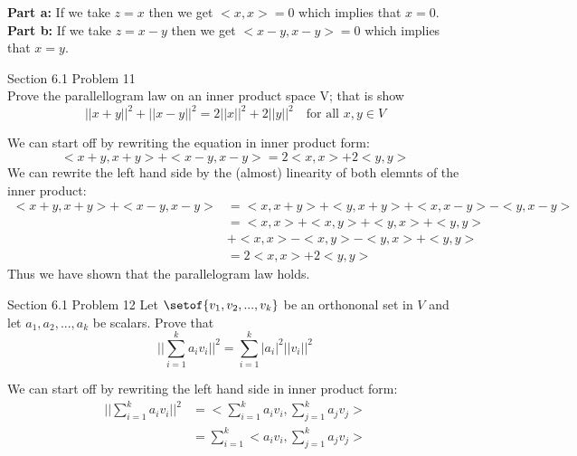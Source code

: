\documentclass[answers,12pt,addpoints]{exam}
\begin{document}
\begin{questions}
    \begin{solution}
        \textbf{Part a:} If we take $z = x$ then we get $<x,x> = 0$ which implies that $x = 0$.\\
        \textbf{Part b:} If we take $z = x - y$ then we get $<x-y,x-y> = 0$ which implies that $x = y$.
    \end{solution}
    \question Section 6.1 Problem 11\\
    Prove the parallellogram law on an inner product space V; that is show
    $$||x+y||^2 + ||x-y||^2 = 2||x||^2 + 2||y||^2 \quad \text{for all } x,y \in V$$
    \begin{solution}
        We can start off by rewriting the equation in inner product form:
        $$ <x+y,x+y> + <x-y,x-y> = 2<x,x> + 2<y,y>$$
        We can rewrite the left hand side by the (almost) linearity of both elemnts of the inner product:
        \begin{align*}
            <x+y,x+y> + <x-y,x-y> &= <x,x+y> + <y,x+y> + <x,x-y> - <y,x-y>\\
            &= <x,x> + <x,y> + <y,x> + <y,y> \\
            &+ <x,x> - <x,y> - <y,x> + <y,y>\\
            &= 2<x,x> + 2<y,y>
        \end{align*}
        Thus we have shown that the parallelogram law holds.
    \end{solution}
    \question Section 6.1 Problem 12
    Let $\setof{v_1,v_2,...,v_k}$ be an orthononal set in $V$ and let $a_1,a_2,...,a_k$ be scalars. Prove that
    $$ ||\sum_{i=1}^{k} a_iv_i||^2 = \sum_{i=1}^{k} |a_i|^2||v_i||^2$$
    \begin{solution}
        We can start off by rewriting the left hand side in inner product form:
        \begin{align*}
            ||\sum_{i=1}^{k} a_iv_i||^2 &= <\sum_{i=1}^{k} a_iv_i, \sum_{j=1}^{k} a_jv_j>\\
            &= \sum_{i=1}^{k} <a_iv_i, \sum_{j=1}^{k} a_jv_j>\\

\end{align*}
\end{solution}
\end{questions}
\end{document}
